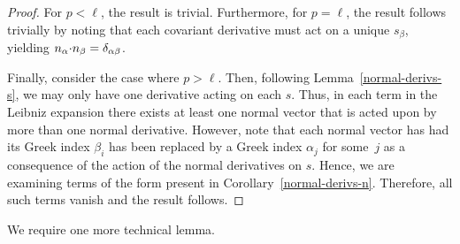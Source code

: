 \documentclass[pdftex]{sigma}
\numberwithin{equation}{section}
\renewcommand{\=}{\stackrel \Lambda =}
\newcommand{\csdot}{\hspace{-0.75mm} \cdot \hspace{-0.75mm}}
\begin{document}
\begin{proof}
For $p < \ell$, the result is trivial. Furthermore, for $p = \ell$, the result follows trivially by noting that each covariant derivative must act on a unique $s_{\beta}$, yielding $n_{\alpha} \csdot n_{\beta} = \delta_{\alpha \beta}$.

Finally, consider the case where $p > \ell$. Then, following Lemma~\ref{normal-derivs-s}, we may only have one derivative acting on each $s$. Thus, in each term in the Leibniz expansion there exists at least one normal vector that is acted upon by more than one normal derivative. However, note that each normal vector has had its Greek index $\beta_i$ has been replaced by a Greek index $\alpha_j$ for some~$j$ as a consequence of the action of the normal derivatives on $s$. Hence, we are examining terms of the form present in Corollary~\ref{normal-derivs-n}. Therefore, all such terms vanish and the result follows.
\end{proof}

We require one more technical lemma.
\end{document}

